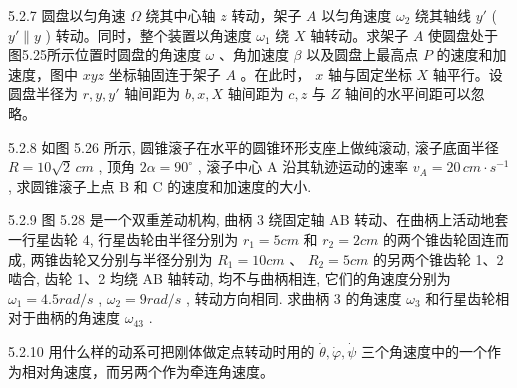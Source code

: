 \begin{problem}{5.2.7}
圆盘以匀角速 $\Omega$ 绕其中心轴 $z$ 转动，架子 $A$ 以匀角速度 $\omega_{2}$ 绕其轴线 $y'$ ( $y' \parallel y$ ) 转动。同时，整个装置以角速度 $\omega_{1}$ 绕 $X$ 轴转动。求架子 $A$ 使圆盘处于图5.25所示位置时圆盘的角速度 $\omega$ 、角加速度 $\beta$ 以及圆盘上最高点 $P$ 的速度和加速度，图中 $xyz$ 坐标轴固连于架子 $A$ 。在此时， $x$ 轴与固定坐标 $X$ 轴平行。设圆盘半径为 $r, y, y'$ 轴间距为 $b, x, X$ 轴间距为 $c, z$ 与 $Z$ 轴间的水平间距可以忽略。
\begin{center}

\end{center}
\end{problem}
\clearpage


\begin{problem}{5.2.8}
如图 5.26 所示, 圆锥滚子在水平的圆锥环形支座上做纯滚动, 滚子底面半径 $R = 10 \sqrt{2} \, cm$ , 顶角 $2\alpha = 90^{\circ}$ , 滚子中心 A 沿其轨迹运动的速率 $v_{A} = 20 \, cm \cdot s^{-1}$ , 求圆锥滚子上点 B 和 C 的速度和加速度的大小.
\begin{center}

\end{center}
\begin{center}

\end{center}
\end{problem}
\clearpage


\begin{problem}{5.2.9}
图 5.28 是一个双重差动机构, 曲柄 3 绕固定轴 AB 转动、在曲柄上活动地套一行星齿轮 4, 行星齿轮由半径分别为 $r_{1}=5cm$ 和 $r_{2}=2cm$ 的两个锥齿轮固连而成, 两锥齿轮又分别与半径分别为 $R_{1}=10cm$ 、 $R_{2}=5cm$ 的另两个锥齿轮 1、2 啮合, 齿轮 1、2 均绕 AB 轴转动, 均不与曲柄相连, 它们的角速度分别为 $\omega_{1}=4.5rad/s$ , $\omega_{2}=9rad/s$ , 转动方向相同. 求曲柄 3 的角速度 $\omega_{3}$ 和行星齿轮相对于曲柄的角速度 $\omega_{43}$ .
\begin{center}

\end{center}
\end{problem}
\clearpage


\begin{problem}{5.2.10}
用什么样的动系可把刚体做定点转动时用的 $\dot{\theta}, \dot{\varphi}, \dot{\psi}$ 三个角速度中的一个作为相对角速度，而另两个作为牵连角速度。
\end{problem}
\clearpage

